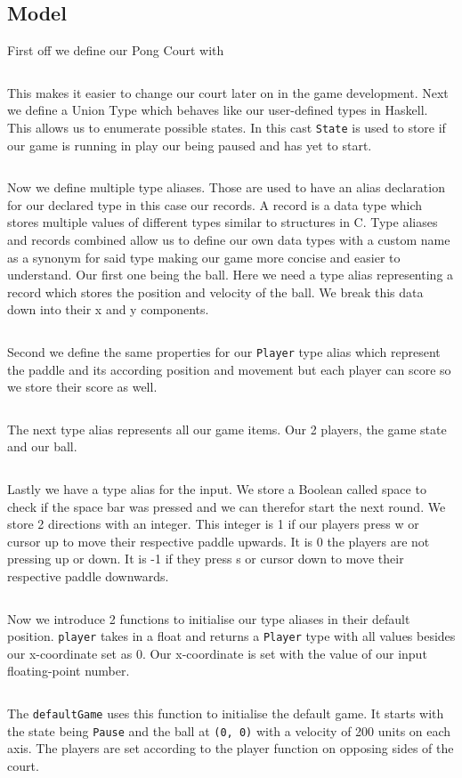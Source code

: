 \documentclass[pdftex,a4paper]{extarticle}
\begin{document}
\subsection{Model}
First off we define our Pong Court with
\inputminted [breaklines=true] {haskell}{pong(2a).hs}
This makes it easier to change our court later on in the game development.
Next we define a Union Type which behaves like our user-defined types in Haskell.
This allows us to enumerate possible states.
In this cast {\tt State} is used to store if our game is running in play our being paused and has yet to start.
\inputminted [breaklines=true] {haskell}{pong(2b).hs}
Now we define multiple type aliases. Those are used to have an alias declaration for our declared type in this case our records\cite{elm-record}.
A record is a data type which stores multiple values of different types similar to structures in C.
Type aliases and records combined allow us to define our own data types with a custom name as a synonym for said type making our game more concise and easier to understand.
Our first one being the ball. 
Here we need a type alias representing a record which stores the position and velocity of the ball.
We break this data down into their x and y components.
\inputminted [breaklines=true] {haskell}{pong(3a).hs}
Second we define the same properties for our {\tt Player} type alias which represent the paddle and its according position and movement but each player can score so we store their score as well.
\inputminted [breaklines=true] {haskell}{pong(3b).hs}
The next type alias represents all our game items. Our 2 players, the game state and our ball.
\inputminted [breaklines=true] {haskell}{pong(3c).hs}
Lastly we have a type alias for the input.
We store a Boolean called space to check if the space bar was pressed and we can therefor start the next round.
We store 2 directions with an integer. 
This integer is 1 if our players press w or cursor up to move their respective paddle upwards. 
It is 0 the players are not pressing up or down. 
It is -1 if they press s or cursor down to move their respective paddle downwards.
\inputminted [breaklines=true] {haskell}{pong(3d).hs}
Now we introduce 2 functions to initialise our type aliases in their default position.
{\tt player} takes in a float and returns a {\tt Player} type with all values besides our x-coordinate set as 0.
Our x-coordinate is set with the value of our input floating-point number.
\inputminted [breaklines=true] {haskell}{pong(4a).hs}
The {\tt defaultGame} uses this function to initialise the default game.
It starts with the state being {\tt Pause} and the ball at {\tt (0, 0)} with a velocity of 200 units on each axis.
The players are set according to the player function on opposing sides of the court.
\inputminted [breaklines=true] {haskell}{pong(4b).hs}
\end{document}
